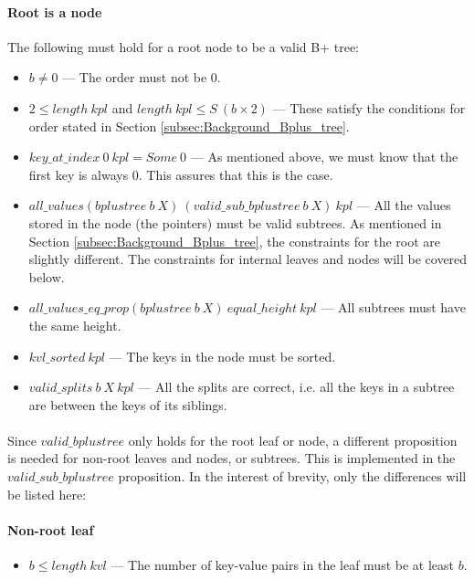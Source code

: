 \paragraph{Root is a node}
The following must hold for a root node to be a valid B+ tree:
\label{valid_root_is_a_node}
\begin{itemize}
\item $b \neq 0$ --- The order must not be 0.
\item $2 \leq length\ kpl$ and $length\ kpl \leq S\ (b \times 2)$ --- These satisfy the conditions for order stated in Section \ref{subsec:Background_Bplus_tree}.
\item $key\_at\_index\ 0\ kpl = Some\ 0$ --- As mentioned above, we must know that the first key is always 0. This assures that this is the case.
\item $all\_values (bplustree\ b\ X)\ (valid\_sub\_bplustree\ b\ X)\ kpl$ --- All the values stored in the node (the pointers) must be valid subtrees. As mentioned in Section \ref{subsec:Background_Bplus_tree}, the constraints for the root are slightly different. The constraints for internal leaves and nodes will be covered below.
\item $all\_values\_eq\_prop (bplustree\ b\ X)\ equal\_height\ kpl$ --- All subtrees must have the same height.
\item $kvl\_sorted\ kpl$ --- The keys in the node must be sorted.
\item $valid\_splits\ b \ X\ kpl$ --- All the splits are correct, i.e. all the keys in a subtree are between the keys of its siblings.
\end{itemize}

\paragraph{}
Since $valid\_bplustree$ only holds for the root leaf or node, a different proposition is needed for non-root leaves and nodes, or subtrees. This is implemented in the $valid\_sub\_bplustree$ proposition. In the interest of brevity, only the differences will be listed here:

\paragraph{Non-root leaf}
\begin{itemize}
\item $b \leq length\ kvl$ --- The number of key-value pairs in the leaf must be at least $b$.
\end{itemize}


